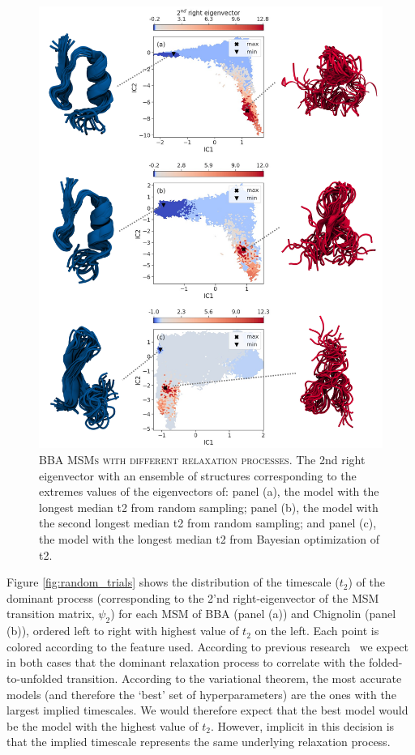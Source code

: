 \documentclass[journal=jacsat,manuscript=article]{achemso}
\begin{document}
\begin{figure}[ht]
    \centering
    \includegraphics[width=0.7\columnwidth]{results1/different_relaxation.png}
    \caption{\textsc{BBA MSMs with different relaxation processes.} The 2nd right eigenvector with an ensemble of structures corresponding to the extremes values of the eigenvectors of: panel (a), the model with the longest median t2 from random sampling; panel (b), the model with the second longest median t2 from random sampling; and panel (c), the model with the longest median t2 from Bayesian optimization of t2.}
    \label{fig:bba_differences}
\end{figure}

Figure \ref{fig:random_trials} shows the distribution of the timescale ($t_2$) of the dominant process (corresponding to the 2'nd right-eigenvector of the MSM transition matrix, $\psi_2$)  for each MSM of BBA (panel (a)) and Chignolin (panel (b)), ordered left to right with highest value of $t_2$ on the left. Each point is colored according to the feature used. According to previous research~\cite{scherer_variational_2019} we expect in both cases that the dominant relaxation process to correlate with the folded-to-unfolded transition. According to the variational theorem, the most accurate models (and therefore the `best' set of hyperparameters) are the ones with the largest implied timescales. We would therefore expect that the best model would be the model with the highest value of $t_2$. However, implicit in this decision is that the implied timescale represents the same underlying relaxation process. 
\end{document}
